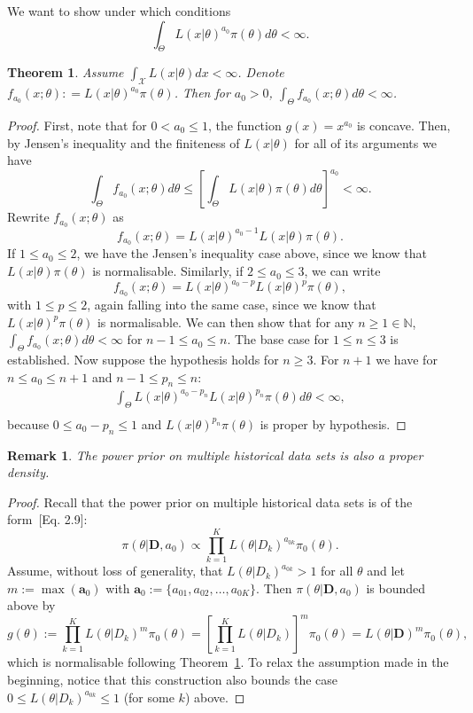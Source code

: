\documentclass[a4paper, notitlepage, 11pt]{article}
\newtheorem{theorem}{Theorem}[]
\newtheorem{remark}{Remark}[]
\begin{document}
We want to show under which conditions
\[\int_{\Theta} L(x | \theta)^{a_0}\pi(\theta) d\theta <\infty.\]
\begin{theorem}
\label{thm:integrability}
 Assume $\int_{\mathcal{X}} L(x | \theta)dx < \infty$.
 Denote $f_{a_0}(x;\theta) : = L(x | \theta)^{a_0}\pi(\theta)$.
 Then for $a_0 > 0$, $\int_{\Theta} f_{a_0}(x;\theta) d\theta <\infty$.
\end{theorem}
\begin{proof}
First, note that for $0 < a_0 \leq 1$, the function $g(x) = x^{a_0}$ is concave.
Then, by Jensen's inequality and the finiteness of $L(x | \theta)$ for all of its arguments we have
\[ \int_{\Theta} f_{a_0}(x; \theta) d\theta \leq \left[ \int_{\Theta} L(x|\theta)\pi(\theta)d\theta \right]^{a_0} < \infty. \]
Rewrite $f_{a_0}(x; \theta)$ as
\[ f_{a_0}(x; \theta) = L(x|\theta)^{a_0 -1} L(x|\theta)\pi(\theta). \]
If $1 \leq a_0 \leq 2$, we have the Jensen's inequality case above, since we know that $L(x|\theta)\pi(\theta)$ is normalisable.
Similarly, if $2 \leq a_0 \leq 3$, we can write 
\[  f_{a_0}(x; \theta) = L(x|\theta)^{a_0-p} L(x|\theta)^p\pi(\theta), \]
with $1 \leq p \leq 2$, again falling into the same case, since we know that $L(x|\theta)^{p}\pi(\theta)$ is normalisable.
We can then show that for any $n \geq 1 \in \mathbb{N}$, $\int_{\Theta}f_{a_0}(x; \theta)d\theta < \infty$ for  $n-1 \leq a_0 \leq n$.
The base case for $1 \leq n \leq 3$ is established.
Now suppose the hypothesis holds for $n \geq 3$.
For $n + 1$ we have for $ n \leq  a_0 \leq n + 1$ and $n-1 \leq p_n \leq n$:
\begin{align*}
 \int_{\Theta} L(x|\theta)^{a_0-p_n} L(x|\theta)^{p_n}\pi(\theta)d\theta < \infty, \\
\end{align*}
because $0 \leq a_0 - p_n \leq 1$ and $L(x|\theta)^{p_n}\pi(\theta)$ is proper by hypothesis.
\end{proof}
\begin{remark}
 The power prior on multiple historical data sets is also a proper density.
\end{remark}
\begin{proof}
 Recall that the power prior on multiple historical data sets is of the form~[Eq. 2.9]\citep{Ibrahim2015}:
 \[ \pi(\theta | \boldsymbol D, a_0) \propto \prod_{k=1}^K L(\theta | D_k)^{a_{0k}} \pi_0(\theta). \]
Assume, without loss of generality, that $L(\theta |  D_k)^{a_{0k}} > 1$ for all $\theta$ and let $m := \max(\boldsymbol a_0)$ with $\boldsymbol a_0 := \{ a_{01}, a_{02}, \ldots, a_{0K}\}$.
Then $\pi(\theta | \boldsymbol D, a_0)$ is bounded above by 
\[  g(\theta) :=  \prod_{k=1}^K L(\theta | D_k)^{m} \pi_0(\theta) =  \left[ \prod_{k=1}^K L(\theta | D_k) \right]^m  \pi_0(\theta) = L(\theta | \boldsymbol D)^m \pi_0(\theta), \]
which is normalisable following Theorem~\ref{thm:integrability}.
To relax the assumption made in the beginning, notice that this construction also bounds the case $ 0 \leq  L(\theta |  D_k)^{a_{0k}} \leq 1$ (for some $k$) above.
\end{proof}
\end{document}
